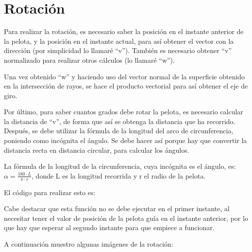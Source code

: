 \newpage

\section{Rotación}

Para realizar la rotación, es necesario saber la posición en el instante anterior de la pelota, y la posición en el instante actual, para así obtener el vector con la dirección (por simplicidad lo llamaré ``v''). También es necesario obtener ``v'' normalizado para realizar otros cálculos (lo llamaré ``w'').

\bigskip

Una vez obtenido ``w'' y haciendo uso del vector normal de la superficie obtenido en la intersección de rayos, se hace el producto vectorial para así obtener el eje de giro.

\bigskip

Por último, para saber cuantos grados debe rotar la pelota, es necesario calcular la distancia de ``v'', de forma que así se obtenga la distancia que ha recorrido. Después, se debe utilizar la fórmula de la longitud del arco de circunferencia, poniendo como incógnita el ángulo. Se debe hacer así porque hay que convertir la distancia recta en distancia circular, para calcular los ángulos. 

\bigskip

La fórmula de la longitud de la circunferencia, cuya incógnita es el ángulo, es: $\alpha = \frac{180 \cdot L}{\pi \cdot r} $, donde L es la longitud recorrida y r el radio de la pelota.

\bigskip

El código para realizar esto es:



Cabe destacar que esta función no se debe ejecutar en el primer instante, al necesitar tener el valor de posición de la pelota guía en el instante anterior, por lo que hay que esperar al segundo instante para que empiece a funcionar.

\bigskip
\newpage

A continuación muestro algunas imágenes de la rotación:

